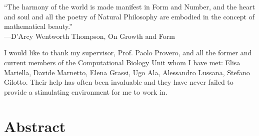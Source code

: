 \documentclass[a4paper,oneside,marginals=justified,nobib]{tufte-book}
\begin{document}
\cleardoublepage
\null{}
\begin{doublespace}
\noindent\fontsize{15}{15}\selectfont\itshape
\nohyphenation

\enquote{The harmony of the world is made manifest in Form and Number, 
	and the heart and soul and all the poetry of Natural Philosophy are 
	embodied in the concept of mathematical beauty.}\\
---D'Arcy Wentworth Thompson, \textnormal{On Growth and Form}


\noindent\fontsize{15}{15}\selectfont\itshape

I would like to thank my supervisor, Prof. Paolo Provero, and all the 
former and current members of the Computational Biology Unit whom I have 
met: Elisa Mariella, Davide Marnetto, Elena Grassi, Ugo Ala, Alessandro 
Lussana, Stefano Gilotto. Their help has often been invaluable and they 
have never failed to provide a stimulating environment for me to work 
in.

\end{doublespace}
\null


\cleardoublepage
\chapter*{Abstract} %
\end{document}
